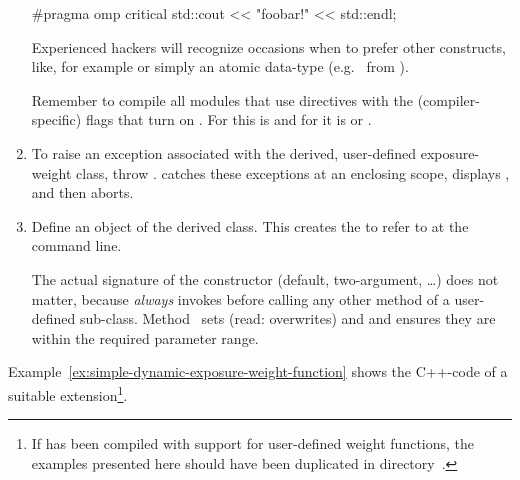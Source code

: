 \begin{enumerate}
  \begin{cxxlisting}
#pragma omp critical
{
    std::cout << "foobar!" << std::endl;
}
  \end{cxxlisting}

  Experienced hackers will recognize occasions when to prefer other
  constructs, like, for example  or simply
  an atomic data-type (e.g.~ from
  ).

  Remember to compile all modules that use  directives
  with the (compiler-specific) flags that turn on .
  For  this is  and for 
  it is  or .

\item
  To raise an exception associated with the derived, user-defined
  exposure-weight class, throw .  \App{}
  catches these exceptions at an enclosing scope, displays
  , and then aborts.

\item
  Define an object of the derived class.  This creates the
   to refer to at the \App{} command line.

  The actual signature of the constructor (default, two-argument,
  \dots) does not matter, because \App{} \emph{always} invokes
   before calling any other method of a user-defined
   sub-class.  Method~ sets
  (read: overwrites)  and  and ensures
  they are within the required parameter range.
\end{enumerate}

Example~\ref{ex:simple-dynamic-exposure-weight-function} shows the
C++-code of a suitable extension\footnote{If \App{} has been compiled
  with support for user-defined weight functions, the examples
  presented here should have been duplicated in
  directory~.}.


